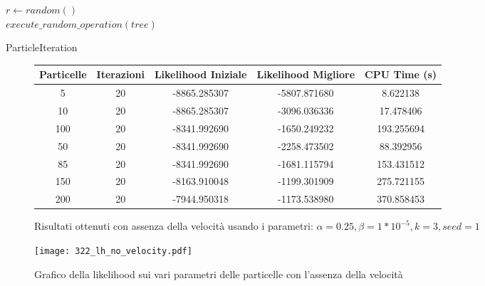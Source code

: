 \begin{algorithm}[!h]
    $r \gets random()$ \\
    $execute\_random\_operation(tree)$
    \caption{ParticleIteration}
    \label{algo:pso-adapt-calculate-1}
\end{algorithm}

\begin{figure}[!h]
  \centering
  \begin{tabular}{*{5}{c}}
    Particelle & Iterazioni & Likelihood Iniziale & Likelihood Migliore & CPU Time (s) \\ \midrule \midrule
    5 & 20 & -8865.285307 & -5807.871680 & 8.622138 \\
    10 & 20 & -8865.285307 & -3096.036336 & 17.478406 \\
    100 & 20 & -8341.992690 & -1650.249232 & 193.255694 \\
    50 & 20 & -8341.992690 & -2258.473502 & 88.392956 \\
    85 & 20 & -8341.992690 & -1681.115794 & 153.431512 \\
    150 & 20 & -8163.910048 & -1199.301909 & 275.721155 \\
    200 & 20 & -7944.950318 & -1173.538980 & 370.858453
  \end{tabular}
  \caption{Risultati ottenuti con assenza della velocità usando i parametri: $\alpha = 0.25, \beta = 1*10^{-5}, k = 3, seed = 1$}
  \label{fig:pso-adapt-calculate-1-table}
\end{figure}

\begin{figure}[!h]
  \centering
  \texttt{[image: 322\_lh\_no\_velocity.pdf]}
  \caption{Grafico della likelihood sui vari parametri delle particelle con l'assenza della velocità}
  \label{fig:pso-adapt-calculate-1-graph}
\end{figure}

